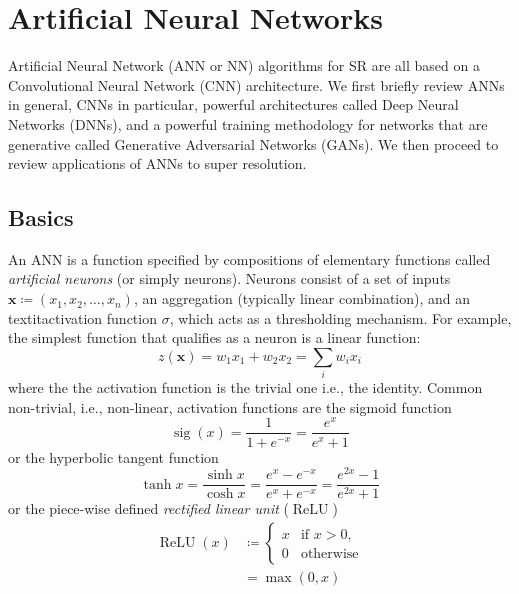 %
\section{Artificial Neural Networks}\label{sec:neural-networks}
\localtableofcontents
Artificial Neural Network (ANN or NN) algorithms for SR are all based on a Convolutional Neural Network (CNN) architecture.
%
We first briefly review ANNs in general, CNNs in particular, powerful architectures called Deep Neural Networks (DNNs), and a powerful training methodology for networks that are generative called Generative Adversarial Networks (GANs).
%
We then proceed to review applications of ANNs to super resolution.
%
\subsection{Basics}

An ANN is a function specified by compositions of elementary functions called \textit{artificial neurons} (or simply neurons).
%
Neurons consist of a set of inputs \(\mathbf{x} \coloneqq (x_1, x_2, \dots, x_n)\), an aggregation (typically linear combination), and an textit{activation function} \(\sigma\), which acts as a thresholding mechanism.
%
For example, the simplest function that qualifies as a neuron is a linear function:
\begin{equation}
    z(\mathbf{x}) = w_1 x_1 + w_2 x_2 = \sum_i w_i x_i
    \label{eqn:simpleann}
\end{equation}
where the the activation function is the trivial one i.e., the identity.
%
Common non-trivial, i.e., non-linear, activation functions are the sigmoid function
\begin{equation}
    \operatorname{sig}(x)={\frac {1}{1+e^{-x}}}={\frac {e^{x}}{e^{x}+1}}
\end{equation}
or the hyperbolic tangent function
\begin{equation}
    \tanh x={\frac {\sinh x}{\cosh x}}={\frac {e^{x}-e^{-x}}{e^{x}+e^{-x}}}={\frac {e^{2x}-1}{e^{2x}+1}}
\end{equation}
or the piece-wise defined \textit{rectified linear unit} (\(\operatorname{ReLU}\))
\begin{align}
    \operatorname{ReLU}(x) & \coloneqq \begin{cases}x&{\text{if }}x>0,\\0&{\text{otherwise}}\end{cases} \\
                           & = \max(0, x)
\end{align}
